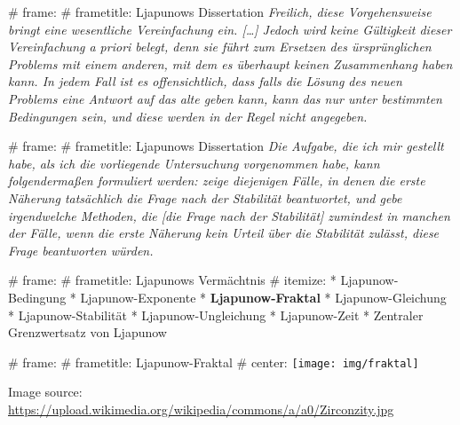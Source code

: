# frame:
  # frametitle: Ljapunows Dissertation
  \emph{%
    \glqq
    Freilich, diese Vorgehensweise bringt eine wesentliche Vereinfachung ein. [\ldots]
    Jedoch wird keine Gültigkeit dieser Vereinfachung \emph{a priori} belegt,
    denn sie führt zum Ersetzen des ürsprünglichen Problems mit einem anderen,
    mit dem es überhaupt keinen Zusammenhang haben kann. In jedem Fall ist es offensichtlich,
    dass falls die Lösung des neuen Problems eine Antwort auf das alte geben kann,
    kann das nur unter bestimmten Bedingungen sein, und diese werden in der Regel nicht angegeben.%
    \grqq
  }

# frame:
  # frametitle: Ljapunows Dissertation
  \emph{%
    \glqq
    Die Aufgabe, die ich mir gestellt habe, als ich die vorliegende Untersuchung vorgenommen habe,
    kann folgendermaßen formuliert werden: zeige diejenigen Fälle, in denen die erste Näherung
    tatsächlich die Frage nach der Stabilität beantwortet, und gebe irgendwelche Methoden,
    die [die Frage nach der Stabilität] zumindest in manchen der Fälle,
    wenn die erste Näherung kein Urteil über die Stabilität zulässt,
    diese Frage beantworten würden.%
    \grqq
  }

# frame:
  # frametitle: Ljapunows Vermächtnis
  # itemize:
    * Ljapunow-Bedingung
    * Ljapunow-Exponente
    * \textbf{Ljapunow-Fraktal}
    * Ljapunow-Gleichung
    * Ljapunow-Stabilität
    * Ljapunow-Ungleichung
    * Ljapunow-Zeit
    * Zentraler Grenzwertsatz von Ljapunow

# frame:
  # frametitle: Ljapunow-Fraktal
  # center:
    \texttt{[image: img/fraktal]}

  \color{mDarkTeal!40!white}
  \tiny{Image source: \url{https://upload.wikimedia.org/wikipedia/commons/a/a0/Zirconzity.jpg}}
